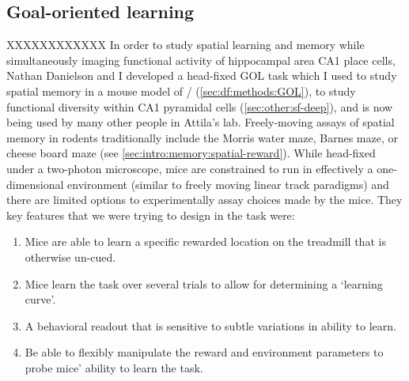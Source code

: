 \subsection{Goal-oriented learning}
\label{sec:intro:techniques:GOL}
XXXXXXXXXXXX
In order to study spatial learning and memory while simultaneously imaging functional activity of hippocampal area CA1 place cells, Nathan Danielson and I developed a head-fixed \acl{GOL} task which I used to study spatial memory in a mouse model of \scz/ (\autoref{sec:df:methods:GOL}), to study functional diversity within CA1 pyramidal cells (\autoref{sec:other:sf-deep}), and is now being used by many other people in Attila's lab.
Freely-moving assays of spatial memory in rodents traditionally include the Morris water maze, Barnes maze, or cheese board maze (see \autoref{sec:intro:memory:spatial-reward}).
While head-fixed under a two-photon microscope, mice are constrained to run in effectively a one-dimensional environment (similar to freely moving linear track paradigms) and there are limited options to experimentally assay choices made by the mice.
They key features that we were trying to design in the task were:
\begin{enumerate}
	\item Mice are able to learn a specific rewarded location on the treadmill that is otherwise un-cued.\label{item:into:techniques:GOL:location}
	\item Mice learn the task over several trials to allow for determining a `learning curve'.\label{item:into:techniques:GOL:learning}
	\item A behavioral readout that is sensitive to subtle variations in ability to learn.\label{item:into:techniques:GOL:readout}
	\item Be able to flexibly manipulate the reward and environment parameters to probe mice' ability to learn the task.\label{item:into:techniques:GOL:manip}
\end{enumerate}

